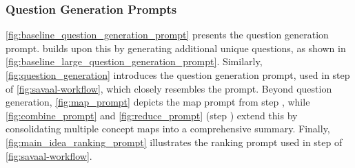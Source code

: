 
\subsubsection{Question Generation Prompts}
\label{subsubsec:question-generation-prompts}

\autoref{fig:baseline_question_generation_prompt} presents the \Baseline question generation prompt. \BaselineMT builds upon this by generating additional unique questions, as shown in \autoref{fig:baseline_large_question_generation_prompt}. Similarly, \autoref{fig:question_generation} introduces the \name question generation prompt, used in step  of \autoref{fig:savaal-workflow}, which closely resembles the \Baseline prompt. Beyond question generation, \autoref{fig:map_prompt} depicts the map prompt from step , while \autoref{fig:combine_prompt} and \autoref{fig:reduce_prompt} (step ) extend this by consolidating multiple concept maps into a comprehensive summary. Finally, \autoref{fig:main_idea_ranking_prompt} illustrates the ranking prompt used in step  of \autoref{fig:savaal-workflow}.


